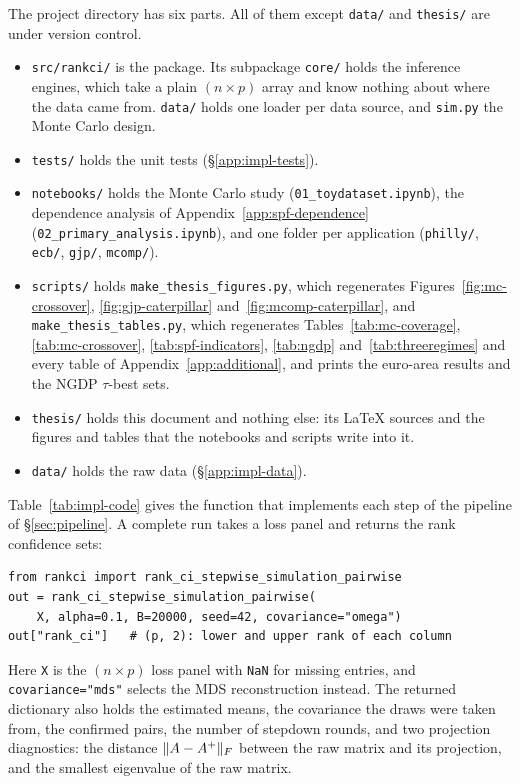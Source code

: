 \begin{appendix}
The project directory has six parts. All of them except \texttt{data/} and
\texttt{thesis/} are under version control.
\begin{itemize}[nosep,leftmargin=*]
  \item \texttt{src/rankci/} is the package. Its subpackage \texttt{core/} holds the
    inference engines, which take a plain $(n\times p)$ array and know nothing about
    where the data came from. \texttt{data/} holds one loader per data source, and
    \texttt{sim.py} the Monte Carlo design.
  \item \texttt{tests/} holds the unit tests (\S\ref{app:impl-tests}).
  \item \texttt{notebooks/} holds the Monte Carlo study
    (\texttt{01\_toydataset.ipynb}), the dependence analysis of
    Appendix~\ref{app:spf-dependence} (\texttt{02\_primary\_analysis.ipynb}), and one
    folder per application (\texttt{philly/}, \texttt{ecb/}, \texttt{gjp/},
    \texttt{mcomp/}).
  \item \texttt{scripts/} holds \texttt{make\_thesis\_figures.py}, which regenerates
    Figures~\ref{fig:mc-crossover}, \ref{fig:gjp-caterpillar}
    and~\ref{fig:mcomp-caterpillar}, and \texttt{make\_thesis\_tables.py}, which
    regenerates Tables~\ref{tab:mc-coverage}, \ref{tab:mc-crossover},
    \ref{tab:spf-indicators}, \ref{tab:ngdp}
    and~\ref{tab:threeregimes} and every table of Appendix~\ref{app:additional}, and
    prints the euro-area results and the NGDP $\tau$-best sets.
  \item \texttt{thesis/} holds this document and nothing else: its LaTeX sources and
    the figures and tables that the notebooks and scripts write into it.
  \item \texttt{data/} holds the raw data (\S\ref{app:impl-data}).
\end{itemize}
Table~\ref{tab:impl-code} gives the function that implements each step of the
pipeline of \S\ref{sec:pipeline}. A complete run takes a loss panel and returns the
rank confidence sets:
\begin{verbatim}
from rankci import rank_ci_stepwise_simulation_pairwise
out = rank_ci_stepwise_simulation_pairwise(
    X, alpha=0.1, B=20000, seed=42, covariance="omega")
out["rank_ci"]   # (p, 2): lower and upper rank of each column
\end{verbatim}
Here \texttt{X} is the $(n\times p)$ loss panel with \texttt{NaN} for missing entries,
and \texttt{covariance="mds"} selects the MDS reconstruction instead. The returned
dictionary also holds the estimated means, the covariance the draws were taken from,
the confirmed pairs, the number of stepdown rounds, and two projection diagnostics: the
distance $\lVert A-A^{+} \rVert_{F}$ between the raw matrix and its projection, and the smallest
eigenvalue of the raw matrix.


\end{appendix}
